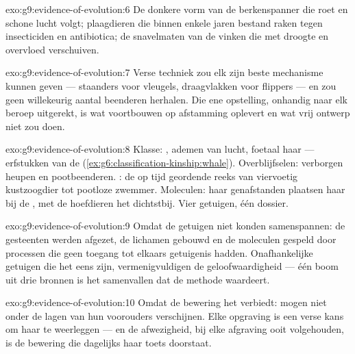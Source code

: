 \begin{solution}{exo:g9:evidence-of-evolution:6}
De donkere vorm van de berkenspanner die roet en schone lucht
volgt; plaagdieren die binnen enkele jaren bestand raken tegen
insecticiden en antibiotica; de snavelmaten van de vinken die met
droogte en overvloed verschuiven.
\end{solution}

\begin{solution}{exo:g9:evidence-of-evolution:7}
Verse techniek zou elk  zijn beste mechanisme kunnen geven
--- staanders voor vleugels, draagvlakken voor flippers --- en zou
geen willekeurig aantal beenderen herhalen. Die ene opstelling,
onhandig naar elk beroep uitgerekt, is wat voortbouwen op
afstamming oplevert en wat vrij ontwerp niet zou doen.
\end{solution}

\begin{solution}{exo:g9:evidence-of-evolution:8}
Klasse: , ademen van lucht, foetaal haar --- erfstukken van de
 (\cref{ex:g6:classification-kinship:whale}).
Overblijfselen: verborgen heupen en pootbeenderen. : de
op tijd geordende reeks van viervoetig kustzoogdier tot pootloze
zwemmer. Moleculen: haar genafstanden plaatsen haar bij de
, met de hoefdieren het dichtstbij. Vier getuigen, één
dossier.
\end{solution}

\begin{solution}{exo:g9:evidence-of-evolution:9}
Omdat de getuigen niet konden samenspannen: de gesteenten werden
afgezet, de lichamen gebouwd en de moleculen gespeld door processen
die geen toegang tot elkaars getuigenis hadden. Onafhankelijke
getuigen die het eens zijn, vermenigvuldigen de geloofwaardigheid
--- één boom uit drie bronnen is het samenvallen dat de methode
waardeert.
\end{solution}

\begin{solution}{exo:g9:evidence-of-evolution:10}
Omdat de bewering het verbiedt:  mogen niet onder de lagen
van hun voorouders verschijnen. Elke opgraving is een verse kans om
haar te weerleggen --- en de afwezigheid, bij elke afgraving ooit
volgehouden, is de bewering die dagelijks haar toets doorstaat.
\end{solution}

